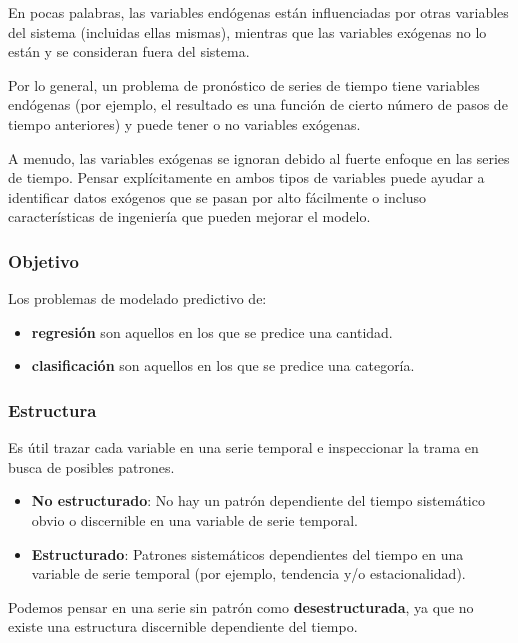 \documentclass[a4paper,12pt]{article}
\begin{document}
En pocas palabras, las variables endógenas están influenciadas por otras variables del sistema (incluidas ellas mismas), mientras que las variables exógenas no lo están y se consideran fuera del sistema.

Por lo general, un problema de pronóstico de series de tiempo tiene variables endógenas (por ejemplo, el resultado es una función de cierto número de pasos de tiempo anteriores) y puede tener o no variables exógenas.

A menudo, las variables exógenas se ignoran debido al fuerte enfoque en las series de tiempo. Pensar explícitamente en ambos tipos de variables puede ayudar a identificar datos exógenos que se pasan por alto fácilmente o incluso características de ingeniería que pueden mejorar el modelo.

\subsubsection{Objetivo}

Los problemas de modelado predictivo de:

\begin{itemize}
	\item \textbf{regresión} son aquellos en los que se predice una cantidad.
	\item  \textbf{clasificación} son aquellos en los que se predice una categoría.
\end{itemize}

\subsubsection{Estructura}

Es útil trazar cada variable en una serie temporal e inspeccionar la trama en busca de posibles patrones.

\begin{itemize}
	\item \textbf{No estructurado}: No hay un patrón dependiente del tiempo sistemático obvio o discernible en una variable de serie temporal.

	\item \textbf{Estructurado}: Patrones sistemáticos dependientes del tiempo en una variable de serie temporal (por ejemplo, tendencia y/o estacionalidad).
\end{itemize}

Podemos pensar en una serie sin patrón como \textbf{desestructurada}, ya que no existe una estructura discernible dependiente del tiempo.
\end{document}
